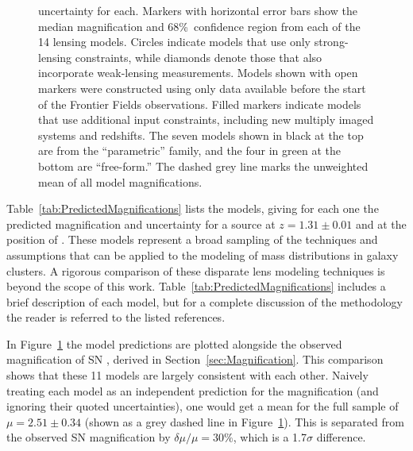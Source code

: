 \begin{figure}
\begin{center}
{uncertainty for each. Markers with horizontal error bars show the
median magnification and 68\%\ confidence region from each of the 14
lensing models.  Circles indicate models that use only strong-lensing
constraints, while diamonds denote those that also incorporate
weak-lensing measurements.  Models shown with open markers were
constructed using only data available before the start of the Frontier
Fields observations.  Filled markers indicate models that use
additional input constraints, including new multiply imaged systems
and redshifts.  The seven models shown in black at the top are from
the ``parametric'' family, and the four in green at the bottom are
``free-form.''  The dashed grey line marks the unweighted mean of all
model magnifications.
\label{fig:lensingtest} }
\end{center}
\end{figure}

Table~\ref{tab:PredictedMagnifications} lists the  models, giving
for each one the predicted magnification and uncertainty for a source
at $z=1.31\pm0.01$ and at the position of \tomas.  These models
represent a broad sampling of the techniques and assumptions that can
be applied to the modeling of mass distributions in galaxy clusters. A
rigorous comparison of these disparate lens modeling techniques is
beyond the scope of this work. Table~\ref{tab:PredictedMagnifications}
includes a brief description of each model, but for a complete
discussion of the methodology the reader is referred to the listed
references.

In Figure~\ref{fig:lensingtest} the model predictions are plotted
alongside the observed magnification of SN \tomas, derived in
Section~\ref{sec:Magnification}.  This comparison shows that these 11
models are largely consistent with each other. Naively treating each
model as an independent prediction for the magnification (and ignoring
their quoted uncertainties), one would get a mean for the full sample
of $\mu=2.51\pm0.34$ (shown as a grey dashed line in
Figure~\ref{fig:lensingtest}).  This is separated from the observed SN
magnification by $\delta\mu/\mu=30\%$, which is a 1.7$\sigma$
difference.

